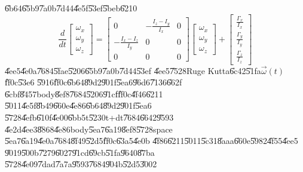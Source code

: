 \documentclass[12pt,a4paper]{article}
\begin{document}
\U{6b64}\U{65b9}\U{7a0b}\U{7d44}\U{4e5f}\U{53ef}\U{5beb}\U{6210}%
\begin{equation}
\frac{d}{dt}\left[ 
\begin{array}{c}
\omega _{x} \\ 
\omega _{y} \\ 
\omega _{z}%
\end{array}%
\right] =\left[ 
\begin{array}{ccc}
0 & -\frac{I_{z}-I_{y}}{I_{x}} & 0 \\ 
-\frac{I_{x}-I_{z}}{I_{y}} & 0 & 0 \\ 
0 & 0 & 0%
\end{array}%
\right] \left[ 
\begin{array}{c}
\omega _{x} \\ 
\omega _{y} \\ 
\omega _{z}%
\end{array}%
\right] +\left[ 
\begin{array}{c}
\frac{\Gamma _{x}}{I_{x}} \\ 
\frac{\Gamma _{y}}{I_{y}} \\ 
\frac{\Gamma _{z}}{I_{z}}%
\end{array}%
\right]
\end{equation}%
\U{4ee5}\U{4e0a}\U{7684}\U{5fae}\U{5206}\U{65b9}\U{7a0b}\U{7d44}\U{53ef}%
\U{4ee5}\U{7528}Ruge Kutta\U{6c42}\U{51fa}$\vec{\omega}(t)$\U{ff0c}\U{53e6}%
\U{5916}\U{ff0c}\U{6b64}\U{89d2}\U{901f}\U{5ea6}\U{96d6}\U{7136}\U{662f}%
\U{6cbf}\U{8457}body\U{8ef8}\U{7684}\U{5206}\U{91cf}\U{ff0c}\U{4f46}\U{6211}%
\U{5011}\U{4e5f}\U{8b49}\U{660e}\U{4e86}\U{6b64}\U{89d2}\U{901f}\U{5ea6}%
\U{5728}\U{4efb}\U{610f}\U{4e00}\U{6bb5}t\U{5230}t+dt\U{7684}\U{6642}\U{9593}%
\U{4e2d}\U{4ee3}\U{8868}\U{4e86}body\U{5ea7}\U{6a19}\U{8ef8}\U{5728}space%
\U{5ea7}\U{6a19}\U{4e0a}\U{7684}\U{8f49}\U{52d5}\U{ff0c}\U{63a5}\U{4e0b}%
\U{4f86}\U{6211}\U{5011}\U{5c31}\U{8aaa}\U{660e}\U{5982}\U{4f55}\U{4ee5}%
\U{9019}\U{500b}\U{7279}\U{6027}\U{91cd}\U{69cb}\U{51fa}\U{9640}\U{87ba}%
\U{5728}\U{4e09}\U{7dad}\U{7a7a}\U{9593}\U{7684}\U{904b}\U{52d5}\U{3002}%
\bigskip

\end{document}
